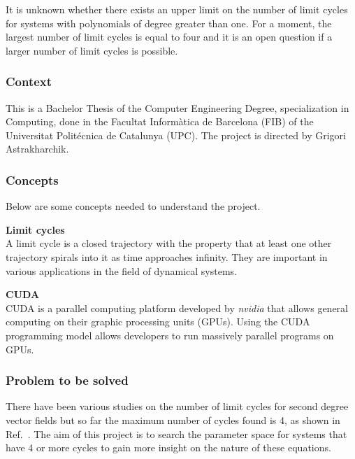 It is unknown whether there exists an upper limit on the number of limit cycles for systems with polynomials of degree greater than one\cite{ilyashenko_centennial_2002}. 
For a moment, the largest number of limit cycles is equal to four and it is an open question if a larger number of limit cycles is possible.

\subsubsection{Context}

This is a Bachelor Thesis of the Computer Engineering Degree, specialization in
Computing, done in the Facultat Inform\`atica de Barcelona (FIB) of the
Universitat Polit\'ecnica de Catalunya (UPC). The project is directed by Grigori
Astrakharchik.

\subsubsection{Concepts}

Below are some concepts needed to understand the project.

\newcommand{\concept}[1]{\textbf{#1}\\}


\concept{Limit cycles}
A limit cycle is a closed trajectory with the property that at least one other
trajectory spirals into it as time approaches infinity. They are important in
various applications in the field of dynamical systems.

\concept{CUDA}
CUDA is a parallel computing platform developed by \emph{nvidia} that allows general
computing on their graphic processing units (GPUs). Using the CUDA programming
model allows developers to run massively parallel programs on GPUs.

\subsubsection{Problem to be solved}

There have been various studies on the number of limit cycles for second degree vector fields but so far the maximum number of cycles found is 4, as shown in Ref.~\cite{kuznetsov_visualization_2013}. The aim of this project is to search the
parameter space for systems that have 4 or more cycles to gain more insight on
the nature of these equations.

